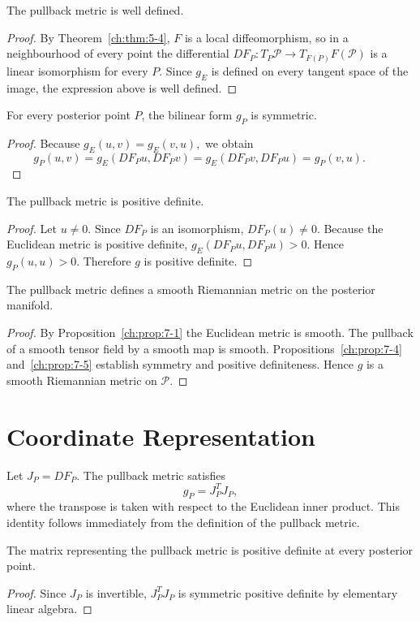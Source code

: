 \begin{proposition}
\label{ch:prop:7-3}
The pullback metric is well defined.
\end{proposition}
\begin{proof}
By Theorem~\ref{ch:thm:5-4}, \(F\) is a local diffeomorphism, so in a neighbourhood of every point the differential
$DF_P:T_P\mathcal P\rightarrow T_{F(P)}F(\mathcal P)$
is a linear isomorphism for every \(P\).
Since \(g_E\) is defined on every tangent space of the image, the expression above is well defined. 
\end{proof}
\begin{proposition}[Symmetry]
\label{ch:prop:7-4}
For every posterior point \(P\), the bilinear form
$g_P$
is symmetric.
\end{proposition}
\begin{proof}
Because
$g_E(u,v)=g_E(v,u),$
we obtain
\[
g_P(u,v)
=
g_E(DF_Pu,DF_Pv)
=
g_E(DF_Pv,DF_Pu)
=
g_P(v,u). \qquad
\]
\end{proof}
\begin{proposition}
\label{ch:prop:7-5}
The pullback metric is positive definite.
\end{proposition}
\begin{proof}
Let
$u\neq0.$
Since
$DF_P$
is an isomorphism,
$DF_P(u)\neq0.$
Because the Euclidean metric is positive definite,
$g_E(DF_Pu,DF_Pu)>0.$
Hence
$g_P(u,u)>0.$
Therefore \(g\) is positive definite. 
\end{proof}
\begin{theorem}
\label{ch:thm:7-6}
The pullback metric defines a smooth Riemannian metric on the posterior manifold.
\end{theorem}
\begin{proof}
By Proposition~\ref{ch:prop:7-1} the Euclidean metric is smooth.
The pullback of a smooth tensor field by a smooth map is smooth.
Propositions~\ref{ch:prop:7-4} and~\ref{ch:prop:7-5} establish symmetry and positive definiteness.
Hence \(g\) is a smooth Riemannian metric on \(\mathcal P\). 
\end{proof}
\section{Coordinate Representation}\label{ch:sec:coordinate-representation}
Let
$J_P=DF_P.$
The pullback metric satisfies
\[
g_P
=
J_P^{\!T}J_P,
\]
where the transpose is taken with respect to the Euclidean inner product.
This identity follows immediately from the definition of the pullback metric.
\begin{corollary}
\label{ch:cor:7-7}
The matrix representing the pullback metric is positive definite at every posterior point.
\end{corollary}
\begin{proof}
Since
$J_P$
is invertible,
$J_P^{\!T}J_P$
is symmetric positive definite by elementary linear algebra. 
\end{proof}
